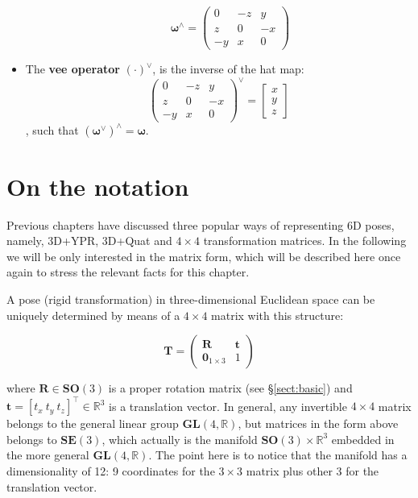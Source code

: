 \documentclass[a4paper,11pt]{report}
\begin{document}
\begin{itemize}
{\begin{equation}
	\quad \quad
	{\bm{\omega}}^\wedge
	=
	\left(
	\begin{array}{ccc}
	0 & -z & y  \\
	z & 0 & -x  \\
	-y & x & 0
	\end{array}
	\right)
	\end{equation}
}
\item{The \textbf{vee operator} $(\cdot)^{\vee}$, is the inverse of the hat map:
	\begin{equation}
	\label{eq:inv.skew}
	\left(
	\begin{array}{ccc}
	0 & -z & y  \\
	z & 0 & -x  \\
	-y & x & 0
	\end{array}
	\right)
	^{\vee}
	=
	\left[ \begin{array}{c} x \\ y \\z \end{array} \right]
	\end{equation}
	\noindent, such that $({\bm{\omega}}^\vee)^\wedge = \bm{\omega}$.
}
\end{itemize}



\section{On the notation}
\label{sect:mat_deriv:not}

Previous chapters have discussed three popular ways of representing 6D poses,
namely, 3D+YPR, 3D+Quat and $4\times 4$ transformation matrices.
In the following we will be only interested in the matrix form, which will be
described here once again to stress the relevant facts for this chapter.

A pose (rigid transformation) in three-dimensional Euclidean space can be uniquely determined by means
of a $4 \times 4$ matrix with this structure:

\begin{equation}
\label{eq:T_Rt}
 \mathbf{T} =
\left(
\begin{array}{c|c}
  \mathbf{R} & \mathbf{t} \\
\hline
  \mathbf{0}_{1\times 3} & 1
\end{array}
\right)
\end{equation}

\noindent where $\mathbf{R} \in \mathbf{SO}(3)$
is a proper rotation matrix (see \S\ref{sect:basic}) and $\mathbf{t}=[t_x ~ t_y ~ t_z]^\top \in \mathbb{R}^3$ is a translation vector.
In general, any invertible $4 \times 4$ matrix belongs to the
general linear group $\mathbf{GL}(4,\mathbb{R})$, but
matrices in the form above belongs to $\mathbf{SE}(3)$,
which actually is the manifold $\mathbf{SO}(3) \times \mathbb{R}^3$
embedded in the more general $\mathbf{GL}(4,\mathbb{R})$.
The point here is to notice that the manifold has a dimensionality of 12:
9 coordinates for the $3\times 3$ matrix plus other 3 for the translation vector.
\end{document}
